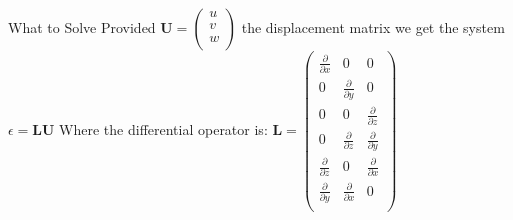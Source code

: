 \documentclass{beamer}
\begin{document}
\begin{frame}{What to Solve}
    Provided $\textbf{U} = \begin{pmatrix}
        u\\
        v\\
        w\\
    \end{pmatrix}$ the displacement matrix we get the system $\epsilon = \textbf{LU}$
    Where the differential operator is:
    $\textbf{L} = \begin{pmatrix}
        \frac{\partial}{\partial x} & 0 & 0\\
        0 & \frac{\partial}{ \partial y} & 0\\
        0 & 0 & \frac{\partial}{\partial z}\\
        0 & \frac{\partial}{\partial z} & \frac{\partial}{\partial y} \\
        \frac{\partial}{\partial z} & 0 & \frac{\partial}{\partial x} \\
        \frac{\partial}{\partial y} & \frac{\partial}{\partial x} & 0 \\
    \end{pmatrix}$

\end{frame}
\end{document}
